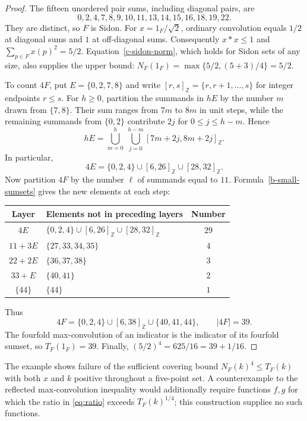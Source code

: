 \begin{proof}
The fifteen unordered pair sums, including diagonal pairs, are
\[
 0,2,4,7,8,9,10,11,13,14,15,16,18,19,22.
\]
They are distinct, so $F$ is Sidon.  For $x=1_F/\sqrt2$, ordinary
convolution equals $1/2$ at diagonal sums and $1$ at off-diagonal sums.
Consequently $x*x\le1$ and $\sum_{p\in F}x(p)^2=5/2$.
Equation~\eqref{c-sidon-norm}, which holds for Sidon sets of any size,
also supplies the upper bound:
$N_F(1_F)=\max\{5/2,(5+3)/4\}=5/2$.

To count $4F$, put $E=\{0,2,7,8\}$ and write
$[r,s]_{\mathbb Z}=\{r,r+1,\ldots,s\}$ for integer endpoints $r\le s$.
For $h\ge0$, partition the summands in $hE$ by the number $m$ drawn
from $\{7,8\}$.  Their sum ranges from $7m$ to $8m$ in unit steps,
while the remaining summands from $\{0,2\}$ contribute $2j$ for
$0\le j\le h-m$.  Hence
\begin{equation}\label{b-small-sumsets}
 hE=\bigcup_{m=0}^{h}\ \bigcup_{j=0}^{h-m}
           [7m+2j,8m+2j]_{\mathbb Z}.
\end{equation}
In particular,
\[
 4E=\{0,2,4\}\cup[6,26]_{\mathbb Z}\cup[28,32]_{\mathbb Z}.
\]
Now partition $4F$ by the number $\ell$ of summands equal to $11$.
Formula~\eqref{b-small-sumsets} gives the new elements at each step:
\begin{center}
\begin{tabular}{clc}
\toprule
Layer & Elements not in preceding layers & Number \\
\midrule
$4E$ & $\{0,2,4\}\cup[6,26]_{\mathbb Z}\cup[28,32]_{\mathbb Z}$ & $29$ \\
$11+3E$ & $\{27,33,34,35\}$ & $4$ \\
$22+2E$ & $\{36,37,38\}$ & $3$ \\
$33+E$ & $\{40,41\}$ & $2$ \\
$\{44\}$ & $\{44\}$ & $1$ \\
\bottomrule
\end{tabular}
\end{center}
Thus
\[
 4F=\{0,2,4\}\cup[6,38]_{\mathbb Z}\cup\{40,41,44\},
 \qquad |4F|=39.
\]
The fourfold max-convolution of an indicator is the indicator of its
fourfold sumset, so $T_F(1_F)=39$.  Finally,
$(5/2)^4=625/16=39+1/16$.
\end{proof}

The example shows failure of the sufficient covering bound
$N_F(k)^4\le T_F(k)$ with both $x$ and $k$ positive throughout a
five-point set.  A counterexample to the reflected max-convolution
inequality would additionally require functions $f,g$ for which the ratio
in \eqref{eq:ratio} exceeds $T_F(k)^{1/4}$; this construction supplies
no such functions.

